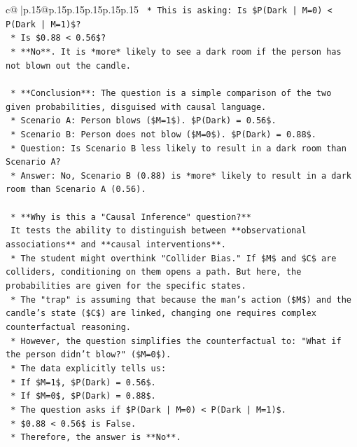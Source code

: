 \documentclass{article}
\begin{document}
{\begin{supertabular}{c@{$\;$}|p{.15\linewidth}@{}p{.15\linewidth}p{.15\linewidth}p{.15\linewidth}p{.15\linewidth}p{.15\linewidth}}
{{{\texttt{        *   This is asking: Is \$P(Dark | M=0) < P(Dark | M=1)\$?} \\
\texttt{        *   Is \$0.88 < 0.56\$?} \\
\texttt{        *   **No**. It is *more* likely to see a dark room if the person has not blown out the candle.} \\
\\ 
\texttt{    *   **Conclusion**: The question is a simple comparison of the two given probabilities, disguised with causal language.} \\
\texttt{        *   Scenario A: Person blows (\$M=1\$). \$P(Dark) = 0.56\$.} \\
\texttt{        *   Scenario B: Person does not blow (\$M=0\$). \$P(Dark) = 0.88\$.} \\
\texttt{        *   Question: Is Scenario B less likely to result in a dark room than Scenario A?} \\
\texttt{        *   Answer: No, Scenario B (0.88) is *more* likely to result in a dark room than Scenario A (0.56).} \\
\\ 
\texttt{    *   **Why is this a "Causal Inference" question?**} \\
\texttt{        It tests the ability to distinguish between **observational associations** and **causal interventions**.} \\
\texttt{        *   The student might overthink "Collider Bias." If \$M\$ and \$C\$ are colliders, conditioning on them opens a path. But here, the probabilities are given for the specific states.} \\
\texttt{        *   The "trap" is assuming that because the man's action (\$M\$) and the candle's state (\$C\$) are linked, changing one requires complex counterfactual reasoning.} \\
\texttt{        *   However, the question simplifies the counterfactual to: "What if the person didn't blow?" (\$M=0\$).} \\
\texttt{        *   The data explicitly tells us:} \\
\texttt{            *   If \$M=1\$, \$P(Dark) = 0.56\$.} \\
\texttt{            *   If \$M=0\$, \$P(Dark) = 0.88\$.} \\
\texttt{        *   The question asks if \$P(Dark | M=0) < P(Dark | M=1)\$.} \\
\texttt{        *   \$0.88 < 0.56\$ is False.} \\
\texttt{        *   Therefore, the answer is **No**.} \\
}}}
\end{supertabular}}
\end{document}
